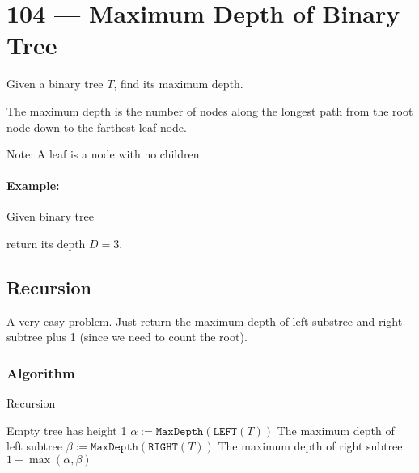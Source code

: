 \section{104 --- Maximum Depth of Binary Tree}
Given a binary tree $T$, find its maximum depth.
\par
The maximum depth is the number of nodes along the longest path from the root node down to the farthest leaf node.
\par
Note: A leaf is a node with no children.
\paragraph{Example:}
Given binary tree
\begin{figure}[H]
\end{figure}
return its depth $D = 3$.
\subsection{Recursion}
A very easy problem. Just return the maximum depth of left substree and right subtree plus 1 (since we need to count the root).
\subsubsection{Algorithm}
\setcounter{algorithm}{0}
\begin{algorithm}[H]
\caption{Recursion}
\begin{algorithmic}[1]
\State {} \Comment Empty tree has height 1
\EndIf
\State $\alpha:=\texttt{MaxDepth}(\texttt{LEFT}(T))$ \Comment The maximum depth of left subtree
\State $\beta:=\texttt{MaxDepth}(\texttt{RIGHT}(T))$ \Comment The maximum depth of right subtree
\State \Return $1+\max(\alpha, \beta)$
\EndProcedure
\end{algorithmic}
\end{algorithm}